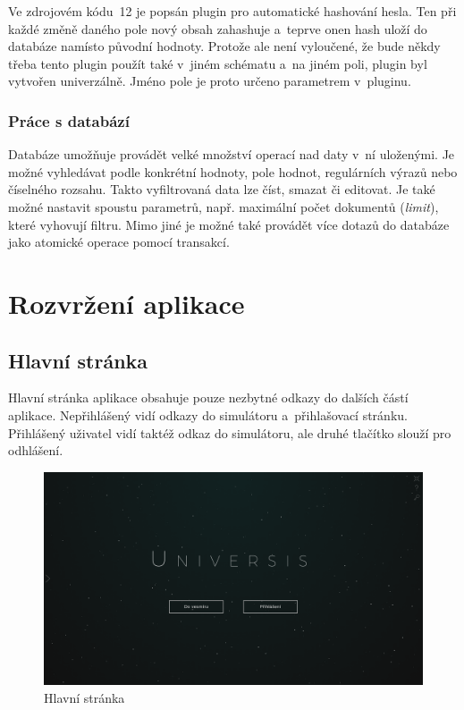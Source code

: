\documentclass[a4paper,12pt]{article}
\begin{document}


Ve zdrojovém kódu~12 je popsán plugin pro automatické hashování hesla. Ten při každé změně daného pole nový obsah zahashuje a~teprve onen hash uloží do databáze namísto původní hodnoty. Protože ale není vyloučené, že bude někdy třeba tento plugin použít také v~jiném schématu a~na jiném poli, plugin byl vytvořen univerzálně. Jméno pole je proto určeno parametrem v~pluginu.

\subsubsection{Práce s databází}

Databáze umožňuje provádět velké množství operací nad daty v~ní uloženými. Je možné vyhledávat podle konkrétní hodnoty, pole hodnot, regulárních výrazů nebo číselného rozsahu. Takto vyfiltrovaná data lze číst, smazat či editovat. Je také možné nastavit spoustu parametrů, např. maximální počet dokumentů (\textit{limit}), které vyhovují filtru. Mimo jiné je možné také provádět více dotazů do databáze jako atomické operace pomocí transakcí.



\section{Rozvržení aplikace}

\subsection{Hlavní stránka}

Hlavní stránka aplikace obsahuje pouze nezbytné odkazy do dalších částí aplikace. Nepřihlášený vidí odkazy do simulátoru a~přihlašovací stránku. Přihlášený uživatel vidí taktéž odkaz do simulátoru, ale druhé tlačítko slouží pro odhlášení.

\begin{figure}[H]
\begin{center}
\includegraphics[width=450pt]{Images/MainPage.png}
\caption{Hlavní stránka}
\label{BodiesList}
\end{center}
\end{figure}
\end{document}
